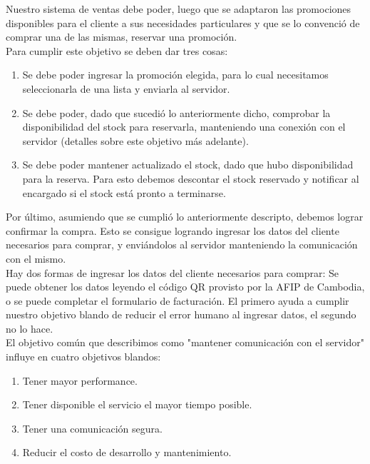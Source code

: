 \indent Nuestro sistema de ventas debe poder, luego que se adaptaron las promociones disponibles para el cliente a sus necesidades particulares y que se lo convenció de comprar una de las mismas, reservar una promoción.\\
\indent Para cumplir este objetivo se deben dar tres cosas:
\begin{enumerate}
  \item Se debe poder ingresar la promoción elegida, para lo cual necesitamos seleccionarla de una lista y enviarla al servidor.
  \item Se debe poder, dado que sucedió lo anteriormente dicho, comprobar la disponibilidad del stock para reservarla, manteniendo una conexión con el servidor (detalles sobre este objetivo más adelante).
  \item Se debe poder mantener actualizado el stock, dado que hubo disponibilidad para la reserva. Para esto debemos descontar el stock reservado y notificar al encargado si el stock está pronto a terminarse.
\end{enumerate}

\indent Por último, asumiendo que se cumplió lo anteriormente descripto, debemos lograr confirmar la compra. Esto se consigue logrando ingresar los datos del cliente necesarios para comprar, y enviándolos al servidor manteniendo la comunicación con el mismo.\\
\indent Hay dos formas de ingresar los datos del cliente necesarios para comprar: Se puede obtener los datos leyendo el código QR provisto por la AFIP de Cambodia, o se puede completar el formulario de facturación. El primero ayuda a cumplir nuestro objetivo blando de reducir el error humano al ingresar datos, el segundo no lo hace.\\

\indent El objetivo común que describimos como "mantener comunicación con el servidor" influye en cuatro objetivos blandos:
\begin{enumerate}
  \item Tener mayor performance.
  \item Tener disponible el servicio el mayor tiempo posible.
  \item Tener una comunicación segura.
  \item Reducir el costo de desarrollo y mantenimiento.
\end{enumerate}

